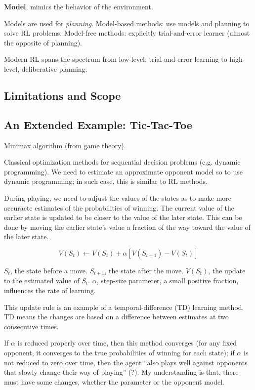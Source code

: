\documentclass[lang=en,mode=geye,device=normal,color=blue,14pt]{elegantnote}
\DeclareMathOperator*{\1}{\mathbbm{1}}
\begin{document}
\begin{definition}
\textbf{Model}, mimics the behavior of the environment.
\end{definition}

Models are used for \textit{planning}.
Model-based methods: use models and planning to solve RL problems.
Model-free methods: explicitly trial-and-error learner (almost the opposite of planning).

Modern RL spans the spectrum from low-level, trial-and-error learning to high-level, deliberative planning.

\subsection{Limitations and Scope}
\subsection{An Extended Example: Tic-Tac-Toe}
Minimax algorithm \cite{wiki_minimax} (from game theory).

Classical optimization methods for sequential decision problems (e.g. dynamic programming). We need to estimate an approximate opponent model so to use dynamic programming; in such case, this is similar to RL methods.

During playing, we need to adjust the values of the states as to make more accuracte estimates of the probabilities of winning. The current value of the earlier state is updated to be closer to the value of the later state. This can be done by moving the earlier state's value a fraction of the way toward the value of the later state.

\begin{equation}
V(S_t) \leftarrow V(S_t) + \alpha[V(S_{t+1}) - V(S_t)]
\end{equation}

$S_t$, the state before a move.
$S_{t+1}$, the state after the move.
$V(S_t)$, the update to the estimated value of $S_t$.
$\alpha$, step-size parameter, a small positive fraction, influences the rate of learning.

This update rule is an example of a temporal-difference (TD) learning method. TD means the changes are based on a difference between estimates at two consecutive times.

If $\alpha$ is reduced properly over time, then this method converges (for any fixed opponent, it converges to the true probabilities of winning for each state); if $\alpha$ is not reduced to zero over time, then the agent ``also plays well against opponents that slowly change their way of playing'' (?). My understanding is that, there must have some changes, whether the parameter or the opponent model.
\end{document}
